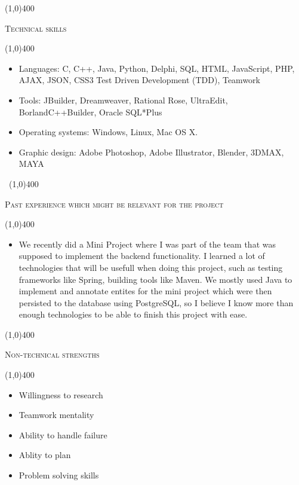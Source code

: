 \documentclass[12pt,a4paper]{report}
\begin{document}
	\begin{center}
	
	\line(1,0){400}\\
	{\scshape\large Technical skills\par}
	\line(1,0){400}\\
	\end{center}
		\begin{itemize}
\item Languages:   C, C++, Java, Python, Delphi, SQL, HTML, JavaScript, PHP, AJAX, JSON, CSS3
Test Driven Development (TDD), Teamwork
\item Tools:  JBuilder, Dreamweaver, Rational Rose, UltraEdit, BorlandC++Builder, Oracle SQL*Plus
\item  Operating systems:   Windows, Linux, Mac OS X.
\item Graphic design:  Adobe Photoshop, Adobe Illustrator, Blender, 3DMAX, MAYA
\end{itemize}
\newpage
\begin{center}
	\vspace*{-3cm}\
	\line(1,0){400}\\
	{\scshape\large Past experience which might be relevant for the project\par}
	\line(1,0){400}\\
	\end{center}
		\begin{itemize}
\item  We recently did a Mini Project where I was part of the team that was supposed to implement the backend functionality. I learned a lot of 
technologies that will be usefull when doing this project, such as testing frameworks like Spring, building tools like Maven. We mostly used Java to implement and annotate entites for the mini project which were then persisted to the database using PostgreSQL, so I believe I know more than enough technologies to be able to finish this project with ease. 


\end{itemize}

	\begin{center}
	
	\line(1,0){400}\\
	{\scshape\large Non-technical strengths\par}
	\line(1,0){400}\\
	\end{center}
		\begin{itemize}
\item Willingness to research
\item Teamwork mentality
\item Ability to handle failure
\item Ablity to plan
\item Problem solving skills
\end{itemize}
\end{document}
